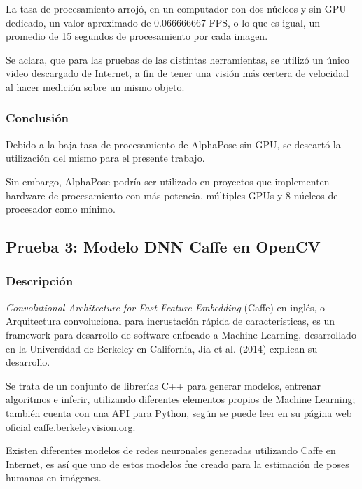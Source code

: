 \documentclass[a4paper,12pt,oneside,spanish]{book}
\begin{document}
La tasa de procesamiento arrojó, en un computador con dos núcleos y sin GPU dedicado, un valor aproximado de 0.066666667 FPS, o lo que es igual, un promedio de 15 segundos de procesamiento por cada imagen. \par

Se aclara, que para las pruebas de las distintas herramientas, se utilizó un único video descargado de Internet, a fin de tener una visión más certera de velocidad al hacer medición sobre un mismo objeto.\par

\subsubsection{Conclusión}
Debido a la baja tasa de procesamiento de AlphaPose sin GPU, se descartó la utilización del mismo para el presente trabajo.\par 

Sin embargo, AlphaPose podría ser utilizado en proyectos que implementen hardware de procesamiento con más potencia, múltiples GPUs y 8 núcleos de procesador como mínimo.\par

\subsection{Prueba 3: Modelo DNN Caffe en OpenCV}
\subsubsection{Descripción}
\textit{Convolutional Architecture for Fast Feature Embedding} (Caffe) en inglés, o Arquitectura convolucional para incrustación rápida de características, es un framework para desarrollo de software enfocado a Machine Learning, desarrollado en la Universidad de Berkeley en California, Jia et al. (2014) \cite{caffe} explican su desarrollo.\par 

Se trata de un conjunto de librerías C++ para generar modelos, entrenar algoritmos e inferir, utilizando diferentes elementos propios de Machine Learning; también cuenta con una API para Python, según se puede leer en su página web oficial \url{caffe.berkeleyvision.org}.\par 

Existen diferentes modelos de redes neuronales generadas utilizando Caffe en Internet, es así que uno de estos modelos fue creado para la estimación de poses humanas en imágenes. \par
\end{document}
